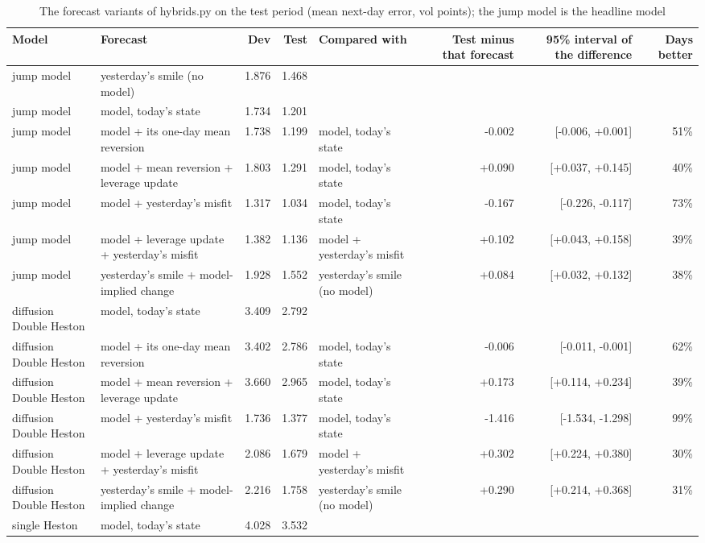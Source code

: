 \begin{table}[ht]
\centering
\small
\caption{The forecast variants of hybrids.py on the test period (mean next-day error, vol points); the jump model is the headline model}
\begin{tabular}{llrrlrrr}
\toprule
Model & Forecast & Dev & Test & Compared with & Test minus that forecast & 95\% interval of the difference & Days better \\
\midrule
jump model & yesterday's smile (no model) & 1.876 & 1.468 &  &  &  &  \\
jump model & model, today's state & 1.734 & 1.201 &  &  &  &  \\
jump model & model + its one-day mean reversion & 1.738 & 1.199 & model, today's state & -0.002 & [-0.006, +0.001] & 51\% \\
jump model & model + mean reversion + leverage update & 1.803 & 1.291 & model, today's state & +0.090 & [+0.037, +0.145] & 40\% \\
jump model & model + yesterday's misfit & 1.317 & 1.034 & model, today's state & -0.167 & [-0.226, -0.117] & 73\% \\
jump model & model + leverage update + yesterday's misfit & 1.382 & 1.136 & model + yesterday's misfit & +0.102 & [+0.043, +0.158] & 39\% \\
jump model & yesterday's smile + model-implied change & 1.928 & 1.552 & yesterday's smile (no model) & +0.084 & [+0.032, +0.132] & 38\% \\
diffusion Double Heston & model, today's state & 3.409 & 2.792 &  &  &  &  \\
diffusion Double Heston & model + its one-day mean reversion & 3.402 & 2.786 & model, today's state & -0.006 & [-0.011, -0.001] & 62\% \\
diffusion Double Heston & model + mean reversion + leverage update & 3.660 & 2.965 & model, today's state & +0.173 & [+0.114, +0.234] & 39\% \\
diffusion Double Heston & model + yesterday's misfit & 1.736 & 1.377 & model, today's state & -1.416 & [-1.534, -1.298] & 99\% \\
diffusion Double Heston & model + leverage update + yesterday's misfit & 2.086 & 1.679 & model + yesterday's misfit & +0.302 & [+0.224, +0.380] & 30\% \\
diffusion Double Heston & yesterday's smile + model-implied change & 2.216 & 1.758 & yesterday's smile (no model) & +0.290 & [+0.214, +0.368] & 31\% \\
single Heston & model, today's state & 4.028 & 3.532 &  &  &  &  \\

\end{tabular}
\end{table}
